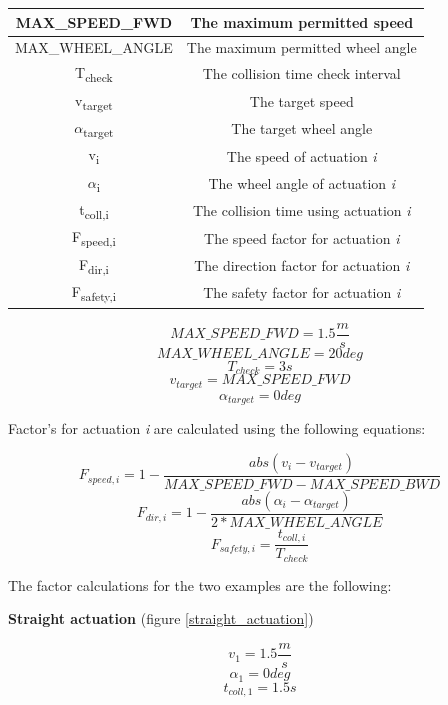 \begin{center}
    \begin{tabular}{ | c | c | }
        \hline
        MAX\_SPEED\_FWD					& The maximum permitted speed 						\\
        \hline
        MAX\_WHEEL\_ANGLE				& The maximum permitted wheel angle 				\\
        \hline
        T\textsubscript{check}  		& The collision time check interval      			\\
        \hline
        v\textsubscript{target}			& The target speed 									\\
        \hline
        $\alpha$\textsubscript{target}  & The target wheel angle      						\\
        \hline
        v\textsubscript{i}  			& The speed of actuation \textit{i}					\\
        \hline
        $\alpha$\textsubscript{i}  		& The wheel angle of actuation \textit{i}			\\
        \hline
        t\textsubscript{coll,i}  		& The collision time using actuation \textit{i}		\\
        \hline
        F\textsubscript{speed,i}  		& The speed factor for actuation \textit{i}			\\
        \hline
        F\textsubscript{dir,i}  		& The direction factor for actuation \textit{i}		\\
        \hline
        F\textsubscript{safety,i}  		& The safety factor for actuation \textit{i}		\\
        \hline
    \end{tabular}
\end{center}

\[ MAX\_SPEED\_FWD = 1.5 \frac{m}{s} \]
\[ MAX\_WHEEL\_ANGLE = 20 deg \]
\[ T_{check} = 3 s \]
\[ v_{target} = MAX\_SPEED\_FWD \]
\[ \alpha_{target} = 0 deg \]

Factor's for actuation \textit{i} are calculated using the following equations:

\[ F_{speed,i} = 1 - \frac{abs(v_{i} - v_{target})}{MAX\_SPEED\_FWD - MAX\_SPEED\_BWD} \]
\[ F_{dir,i} = 1 - \frac{abs(\alpha_{i} - \alpha_{target})}{2 * MAX\_WHEEL\_ANGLE} \]
\[ F_{safety,i} = \frac{t_{coll,i}}{T_{check}} \]

The factor calculations for the two examples are the following:

\textbf{Straight actuation} (figure \ref{straight_actuation})

\[ v_{1} = 1.5 \frac{m}{s} \]
\[ \alpha_{1} = 0 deg \]
\[ t_{coll,1} = 1.5 s \]

